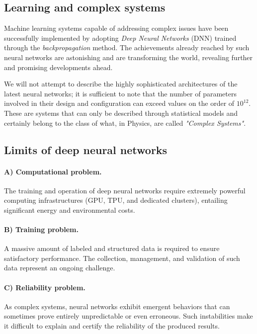 \documentclass[12pt,a4paper]{article}
\begin{document}
\subsection{Learning and complex systems}
Machine learning systems capable of addressing complex issues have been successfully implemented by adopting \textit{Deep Neural Networks} (DNN) trained through the \textit{backpropagation} method. 
The achievements already reached by such neural networks are astonishing and are transforming the world, revealing further and promising developments ahead. 

We will not attempt to describe the highly sophisticated architectures of the latest neural networks; it is sufficient to note that the number of parameters involved in their design and configuration can exceed values on the order of $10^{12}$. 
These are systems that can only be described through statistical models and certainly belong to the class of what, in Physics, are called \textit{"Complex Systems"}.

\subsection{Limits of deep neural networks}

\paragraph{A) Computational problem.} 
The training and operation of deep neural networks require extremely powerful computing infrastructures (GPU, TPU, and dedicated clusters), entailing significant energy and environmental costs.

\paragraph{B) Training problem.} 
A massive amount of labeled and structured data is required to ensure satisfactory performance. 
The collection, management, and validation of such data represent an ongoing challenge.

\paragraph{C) Reliability problem.} 
As complex systems, neural networks exhibit emergent behaviors that can sometimes prove entirely unpredictable or even erroneous. 
Such instabilities make it difficult to explain and certify the reliability of the produced results.
\end{document}
